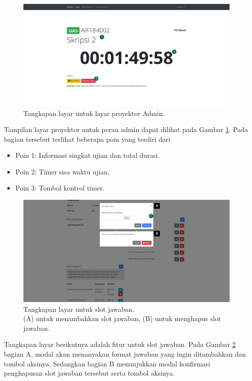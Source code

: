     \begin{figure}
        \centering
        \includegraphics[width=0.7\paperwidth]{Gambar/implemented-interface/admin/timer-admin.png}
        \caption{Tangkapan layar untuk layar proyektor Admin.}
        \label{fig:screenshot-admin-exam-projector}
    \end{figure}
    Tampilan layar proyektor untuk peran admin dapat dilihat pada Gambar \ref{fig:screenshot-admin-exam-projector}.
    Pada bagian tersebut terlihat beberapa poin yang terdiri dari
    \begin{itemize}
        \item Poin 1: Informasi singkat ujian dan total durasi.
        \item Poin 2: Timer sisa waktu ujian.
        \item Poin 3: Tombol kontrol timer.
    \end{itemize}
    
    \begin{figure}
        \centering
        \includegraphics[width=0.7\paperwidth]{Gambar/implemented-interface/admin/ujian-slot-tambah.png}
        \caption{Tangkapan layar untuk slot jawaban. \\ (A) untuk menambahkan slot jawaban, (B) untuk menghapus slot jawaban.}
        \label{fig:screenshot-admin-slot-jawab}
    \end{figure}
    Tangkapan layar berikutnya adalah fitur untuk slot jawaban. Pada Gambar \ref{fig:screenshot-admin-slot-jawab}
    bagian A, modal akan menanyakan format jawaban yang ingin ditambahkan dan tombol aksinya. Sedangkan bagian
    B menunjukkan modal konfirmasi penghapusan slot jawaban tersebut serta tombol aksinya.
    
